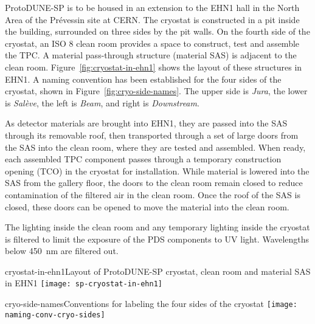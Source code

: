 
\label{ch:spacereq}

ProtoDUNE-SP is to be housed in an extension to the EHN1 hall in the North Area of the Pr\'{e}vessin site at CERN. 
The cryostat is constructed in a pit inside the building, surrounded on three sides by the pit walls.  On the fourth side of the cryostat, an ISO 8 clean room provides a space to construct, test and assemble the TPC. A material pass-through structure (material SAS) is adjacent to the clean room. Figure~\ref{fig:cryostat-in-ehn1} shows the layout of these structures in EHN1. A naming convention has been established for the four sides of the cryostat, shown in Figure~\ref{fig:cryo-side-names}.  The upper side is \textit{Jura}, the lower is \textit{Sal\`{e}ve}, the left is \textit{Beam}, and right is \textit{Downstream}.


As detector materials are brought into EHN1, they are passed into the SAS through its removable roof, then transported through a set of large doors from the SAS into the clean room, where they are tested and assembled. When ready, each assembled TPC component passes through a temporary construction opening (TCO) in the cryostat for installation.
While material is lowered into the SAS from the gallery floor, the doors to the clean room remain closed to reduce contamination of the filtered air in the clean room.
Once the roof of the SAS is closed, these doors can be opened to move the material into the clean room.  

The lighting inside the clean room and any temporary lighting inside the cryostat is filtered to limit the exposure of the PDS components to UV light.  Wavelengths below 450~nm are filtered out.   

\begin{cdrfigure}{cryostat-in-ehn1}{Layout of ProtoDUNE-SP cryostat, clean room and material SAS in EHN1}
\texttt{[image: sp-cryostat-in-ehn1]}
\end{cdrfigure}


\begin{cdrfigure}{cryo-side-names}{Conventions for labeling the four sides of the cryostat}
\texttt{[image: naming-conv-cryo-sides]}
\end{cdrfigure}

